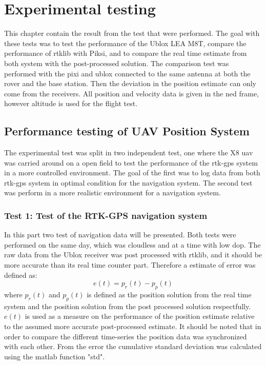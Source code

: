 
\chapter{Experimental testing}
This chapter contain the result from the test that were performed. The goal with these tests was to test the performance of the Ublox LEA M8T, compare the performance of \acrfull{rtklib} with Piksi, and to compare the real time estimate from both system with the post-processed solution. The comparison test was performed with the pixi and ublox connected to the same antenna at both the rover and the base station. Then the deviation in the position estimate can only come from the receivers. All position and velocity data is given in the \gls{ned} frame, however altitude is used for the flight test.
\section{Performance testing of UAV Position System}
The experimental test was split in two independent test, one where the X8 \gls{uav} was carried around on a open field to test the performance of the \gls{rtk-gps} system in a more controlled environment. The goal of the first was to log data from both \gls{rtk-gps} system in optimal condition for the navigation system. The second test was perform in a more realistic environment for a navigation system. 


\subsection{Test 1: Test of the RTK-GPS navigation system}
In this part two test of navigation data will be presented. Both tests were performed on the same day, which was cloudless and at a time with low \gls{dop}. The raw data from the Ublox receiver was post processed with \gls{rtklib}, and it should be more accurate than its real time counter part. Therefore a estimate of error was defined as:
\begin{equation}
e(t) = p_r(t) - p_p(t)
\end{equation}
where $p_r(t)$ and $p_p(t)$ is defined as the position solution from the real time system and the position solution from the post processed solution respectfully. $e(t)$ is used as a measure on the performance of the position estimate relative to the assumed more accurate post-processed estimate. It should be noted that in order to compare the different time-series the position data was synchronized with each other. From the error the cumulative standard deviation was calculated using the matlab function "std".
